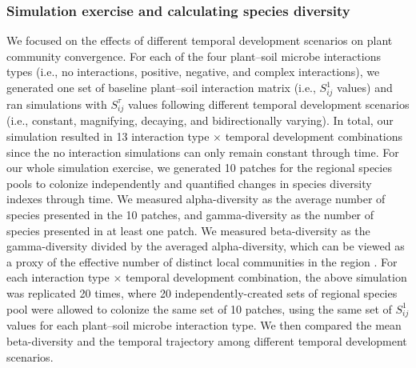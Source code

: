 \subsubsection*{Simulation exercise and calculating species diversity}
We focused on the effects of different temporal development scenarios on plant community convergence.
For each of the four plant--soil microbe interactions types (i.e., no interactions, positive, negative, and complex interactions), we generated one set of baseline plant--soil interaction matrix (i.e., $S_{ij}^{1}$ values) and ran simulations with $S_{ij}^{\tau}$ values following different temporal development scenarios (i.e., constant, magnifying, decaying, and bidirectionally varying).
In total, our simulation resulted in 13 interaction type $\times$ temporal development combinations since the no interaction simulations can only remain constant through time.
For our whole simulation exercise, we generated 10 patches for the regional species pools to colonize independently and quantified changes in species diversity indexes through time. 
We measured alpha-diversity as the average number of species presented in the 10 patches, and gamma-diversity as the number of species presented in at least one patch. We measured beta-diversity as the gamma-diversity divided by the averaged alpha-diversity, which can be viewed as a proxy of the effective number of distinct local communities in the region \citep{FukamiNakajima2011}.
For each interaction type $\times$ temporal development combination, the above simulation was replicated 20 times, where 20 independently-created sets of regional species pool were allowed to colonize the same set of 10 patches, using the same set of $S_{ij}^{1}$ values for each plant--soil microbe interaction type. We then compared the mean beta-diversity and the temporal trajectory among different temporal development scenarios.
\par



\clearpage
